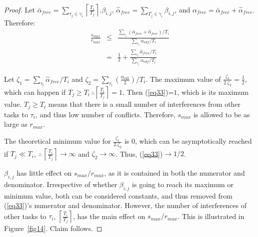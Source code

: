 \documentclass[12pt,english]{report}
\newtheorem{proof}{Proof}
\begin{document}
\begin{proof}
Let $\bar{\alpha}_{free}=\sum_{\tau_{j}\in\gamma_{i}}\left\lceil\frac{T_{i}}{T_{j}}\right\rceil.\beta_{i,j}$,  $\hat{\alpha}_{free}=\sum_{T_{j}\in\gamma_{i}}\beta_{i,j}$, and $\alpha_{free}=\bar{\alpha}_{free}+\hat{\alpha}_{free}.$ Therefore: 
\begin{eqnarray}
\frac{s_{max}}{r_{max}} & \le & \frac{\sum_{\tau_{i}}(\bar{\alpha}_{free} +\hat{\alpha}_{free})/T_{i}}{\sum_{\tau_{i}}\alpha_{edf}/T_{i}}\nonumber \\
 & = & \frac{1}{2}+\frac{\sum_{\tau_{i}}\hat{\alpha}_{free} /T_{i}}{\sum_{\tau_{i}}\alpha_{edf}/T_{i}}
 \label{eq33}
 \end{eqnarray}

Let $\zeta_{1}=\sum_{\tau_{i}}\hat{\alpha}_{free}/T_{i}$
and $\zeta_{2}=\sum_{\tau_{i}}\left(\frac{\alpha_{edf}}{2}\right)/T_{i}$. The maximum value of $\frac{\zeta_{1}}{2.\zeta_{2}}=\frac{1}{2}$, which can happen if $T_{j}\ge T_{i}\,\therefore\left\lceil\frac{T_{i}}{T_{j}}\right\rceil=1$. Then (\ref{eq33})=$1$, which is its maximum value. $T_{j}\ge T_{i}$ means that there is a small number of interferences from other tasks
to $\tau_{i}$, and thus low number of conflicts. Therefore, $s_{max}$ is
allowed to be as large as $r_{max}$.

The theoretical minimum value for $\frac{\zeta_{1}}{2.\zeta_{2}}$
is $0$, which can be asymptotically reached if $T_{j}\ll T_{i}$,
$\therefore\,\left\lceil\frac{T_{i}}{T_{j}}\right\rceil\rightarrow\infty$
and $\zeta_{2}\rightarrow\infty$. Thus, (\ref{eq33})$\rightarrow1/2$.

$\beta_{i,j}$ has little effect on $s_{max}/r_{max}$, 
as it is contained in both the numerator and denominator. Irrespective of whether $\beta_{i,j}$ is going to reach its maximum or minimum value, both can be considered constants, and thus removed from (\ref{eq33})'s numerator and denominator. 
However, the number of
interferences of other tasks to $\tau_{i}$, $\left\lceil\frac{T_{i}}{T_{j}}\right\rceil$,
has the main effect on $s_{max}/r_{max}$. This is illustrated in Figure~\ref{fig14}. Claim follows.
\end{proof}
\end{document}
